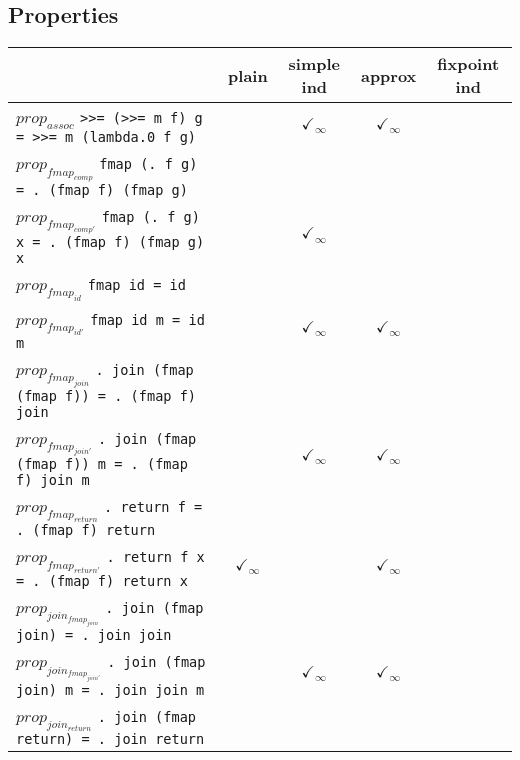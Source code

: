\documentclass{article}
\begin{document}
\subsection*{Properties}
\begin{longtable}{p{10cm} || c | c | c | c | }
  & plain & simple ind & approx & fixpoint ind \\
\hline
$prop_{assoc}$ \newline \verb`>>= (>>= m f) g = >>= m (lambda.0 f g)` &  & $\checkmark_{\infty}$ & $\checkmark_{\infty}$ &  \\
\hline
$prop_{fmap_{comp}}$ \newline \verb`fmap (. f g) = . (fmap f) (fmap g)` &  &  &  &  \\
\hline
$prop_{fmap_{comp'}}$ \newline \verb`fmap (. f g) x = . (fmap f) (fmap g) x` &  & $\checkmark_{\infty}$ &  &  \\
\hline
$prop_{fmap_{id}}$ \newline \verb`fmap id = id` &  &  &  &  \\
\hline
$prop_{fmap_{id'}}$ \newline \verb`fmap id m = id m` &  & $\checkmark_{\infty}$ & $\checkmark_{\infty}$ &  \\
\hline
$prop_{fmap_{join}}$ \newline \verb`. join (fmap (fmap f)) = . (fmap f) join` &  &  &  &  \\
\hline
$prop_{fmap_{join'}}$ \newline \verb`. join (fmap (fmap f)) m = . (fmap f) join m` &  & $\checkmark_{\infty}$ & $\checkmark_{\infty}$ &  \\
\hline
$prop_{fmap_{return}}$ \newline \verb`. return f = . (fmap f) return` &  &  &  &  \\
\hline
$prop_{fmap_{return'}}$ \newline \verb`. return f x = . (fmap f) return x` & $\checkmark_{\infty}$ &  & $\checkmark_{\infty}$ &  \\
\hline
$prop_{join_{fmap_{join}}}$ \newline \verb`. join (fmap join) = . join join` &  &  &  &  \\
\hline
$prop_{join_{fmap_{join'}}}$ \newline \verb`. join (fmap join) m = . join join m` &  & $\checkmark_{\infty}$ & $\checkmark_{\infty}$ &  \\
\hline
$prop_{join_{return}}$ \newline \verb`. join (fmap return) = . join return` &  &  &  &  \\

\end{longtable}
\end{document}
